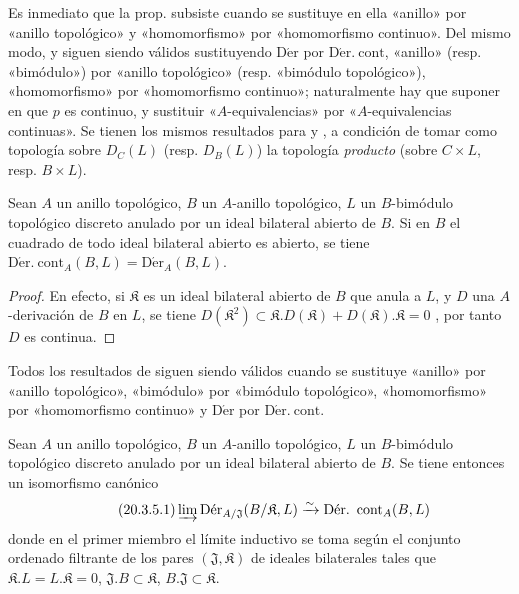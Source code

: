 \begin{env}[20.3.2]
\label{0.20.3.2-fr}
Es inmediato que la prop.  subsiste cuando se sustituye en ella
«anillo» por «anillo topológico» y «homomorfismo» por
«homomorfismo continuo». Del mismo modo,  y
 siguen siendo válidos sustituyendo $\operatorname{D\acute{e}r}$ por
$\operatorname{D\acute{e}r.\ cont}$, «anillo» (resp. «bimódulo») por «anillo
topológico» (resp. «bimódulo topológico»), «homomorfismo» por
«homomorfismo continuo»; naturalmente hay que suponer en
 que $p$ es continuo, y sustituir «$A$-equivalencias» por
«$A$-equivalencias continuas». Se tienen los mismos resultados para
 y , a condición de tomar como
topología sobre $D_C(L)$ (resp. $D_B(L)$) la topología \emph{producto} (sobre
$C\times L$, resp. $B\times L$).
\end{env}

\begin{proposition}[20.3.3]
\label{0.20.3.3-fr}
Sean $A$ un anillo topológico, $B$ un $A$-anillo topológico, $L$ un
$B$-bimódulo topológico discreto anulado por un ideal bilateral abierto de $B$.
Si en $B$ el cuadrado de todo ideal bilateral abierto es abierto, se tiene
$\operatorname{D\acute{e}r.\ cont}_A(B,L)=\operatorname{D\acute{e}r}_A(B,L)$.
\end{proposition}

\begin{proof}
En efecto, si $\mathfrak{K}$ es un ideal bilateral abierto de $B$ que anula a $L$,
y $D$ una $A$-derivación de $B$ en $L$, se tiene
$D(\mathfrak{K}^2)\subset\mathfrak{K}.D(\mathfrak{K})+
D(\mathfrak{K}).\mathfrak{K}=0$ , por tanto $D$ es continua.
\end{proof}

\begin{env}[20.3.4]
\label{0.20.3.4-fr}
Todos los resultados de  siguen siendo válidos cuando se sustituye
«anillo» por «anillo topológico», «bimódulo» por «bimódulo
topológico», «homomorfismo» por «homomorfismo continuo» y
$\operatorname{D\acute{e}r}$ por $\operatorname{D\acute{e}r.\ cont}$.
\end{env}

\begin{proposition}[20.3.5]
\label{0.20.3.5-fr}
Sean $A$ un anillo topológico, $B$ un $A$-anillo topológico, $L$ un
$B$-bimódulo topológico discreto anulado por un ideal bilateral abierto de $B$.
Se tiene entonces un isomorfismo canónico
\begin{equation}
\tag{20.3.5.1}
\label{0.20.3.5.1-fr}
  \varinjlim\operatorname{D\acute{e}r}_{A/\mathfrak{J}}
  (B/\mathfrak{K},L)\xrightarrow{\sim}
  \operatorname{D\acute{e}r.\ cont}_A(B,L)
\end{equation}
donde en el primer miembro el límite inductivo se toma según el conjunto
ordenado filtrante de los pares $(\mathfrak{J},\mathfrak{K})$ de ideales bilaterales
tales que $\mathfrak{K}.L=L.\mathfrak{K}=0$,
$\mathfrak{J}.B\subset\mathfrak{K}$,
$B.\mathfrak{J}\subset\mathfrak{K}$.
\end{proposition}

